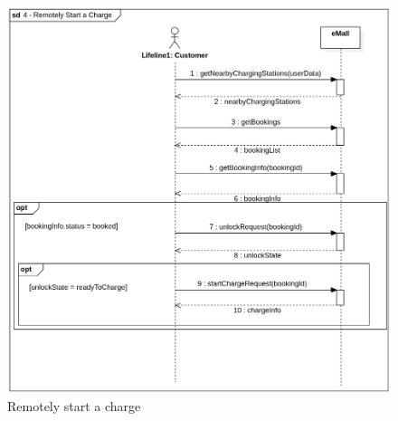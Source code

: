 \begin{figure}[H]
    \begin{center}
        \includegraphics[width=\textwidth]{img/sequence/start.png}
        \caption{Remotely start a charge}
    \end{center}
\end{figure}
